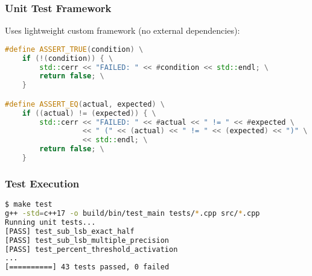 \subsubsection{Unit Test Framework}

Uses lightweight custom framework (no external dependencies):

\begin{lstlisting}[language=C++]
#define ASSERT_TRUE(condition) \
    if (!(condition)) { \
        std::cerr << "FAILED: " << #condition << std::endl; \
        return false; \
    }

#define ASSERT_EQ(actual, expected) \
    if ((actual) != (expected)) { \
        std::cerr << "FAILED: " << #actual << " != " << #expected \
                  << " (" << (actual) << " != " << (expected) << ")" \
                  << std::endl; \
        return false; \
    }
\end{lstlisting}

\subsubsection{Test Execution}

\begin{lstlisting}[language=bash]
$ make test
g++ -std=c++17 -o build/bin/test_main tests/*.cpp src/*.cpp
Running unit tests...
[PASS] test_sub_lsb_exact_half
[PASS] test_sub_lsb_multiple_precision
[PASS] test_percent_threshold_activation
...
[==========] 43 tests passed, 0 failed
\end{lstlisting}

